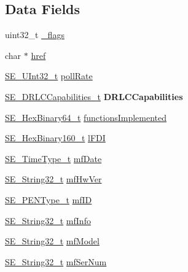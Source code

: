 \subsection*{Data Fields}
\begin{DoxyCompactItemize}
\item 
uint32\+\_\+t \hyperlink{group__DeviceInformation_gabb744ffd3504840eaaa09afcc5b8d831}{\+\_\+flags}
\item 
char $\ast$ \hyperlink{group__DeviceInformation_ga6a53de1479cd71c2f8125105ae4b0ac9}{href}
\item 
\hyperlink{group__UInt32_ga70bd4ecda3c0c85d20779d685a270cdb}{S\+E\+\_\+\+U\+Int32\+\_\+t} \hyperlink{group__DeviceInformation_gad3dda87fa156377fc8c597dec91356f4}{poll\+Rate}
\item 
\hyperlink{structSE__DRLCCapabilities__t}{S\+E\+\_\+\+D\+R\+L\+C\+Capabilities\+\_\+t} {\bfseries D\+R\+L\+C\+Capabilities}
\item 
\hyperlink{group__HexBinary64_ga718baff6d79d03afcdd37d53265c4684}{S\+E\+\_\+\+Hex\+Binary64\+\_\+t} \hyperlink{group__DeviceInformation_ga17ad36c58e0576526622d098d987ae55}{functions\+Implemented}
\item 
\hyperlink{group__HexBinary160_ga92b92aa55555bdb75f3a59060f2c1632}{S\+E\+\_\+\+Hex\+Binary160\+\_\+t} \hyperlink{group__DeviceInformation_ga48d5783d339ebf6ed3d0d95efc1d949c}{l\+F\+DI}
\item 
\hyperlink{group__TimeType_ga6fba87a5b57829b4ff3f0e7638156682}{S\+E\+\_\+\+Time\+Type\+\_\+t} \hyperlink{group__DeviceInformation_ga2e28d4743854f288b96a82c8245d91ca}{mf\+Date}
\item 
\hyperlink{group__String32_gac9f59b06b168b4d2e0d45ed41699af42}{S\+E\+\_\+\+String32\+\_\+t} \hyperlink{group__DeviceInformation_ga6ef29f550955cd0a4aad80a85243890b}{mf\+Hw\+Ver}
\item 
\hyperlink{group__PENType_ga75343bbeec563c431fef2977b4dfa4e9}{S\+E\+\_\+\+P\+E\+N\+Type\+\_\+t} \hyperlink{group__DeviceInformation_ga891b4a255b2672082d282b7bf759392e}{mf\+ID}
\item 
\hyperlink{group__String32_gac9f59b06b168b4d2e0d45ed41699af42}{S\+E\+\_\+\+String32\+\_\+t} \hyperlink{group__DeviceInformation_ga191206c92cb8b844c177b5ca3929fb59}{mf\+Info}
\item 
\hyperlink{group__String32_gac9f59b06b168b4d2e0d45ed41699af42}{S\+E\+\_\+\+String32\+\_\+t} \hyperlink{group__DeviceInformation_gaa34170d067e5cbe470296ab74a692ab3}{mf\+Model}
\item 
\hyperlink{group__String32_gac9f59b06b168b4d2e0d45ed41699af42}{S\+E\+\_\+\+String32\+\_\+t} \hyperlink{group__DeviceInformation_gae791a02f4f5caefec3aafdc233b8d840}{mf\+Ser\+Num}

\end{DoxyCompactItemize}
